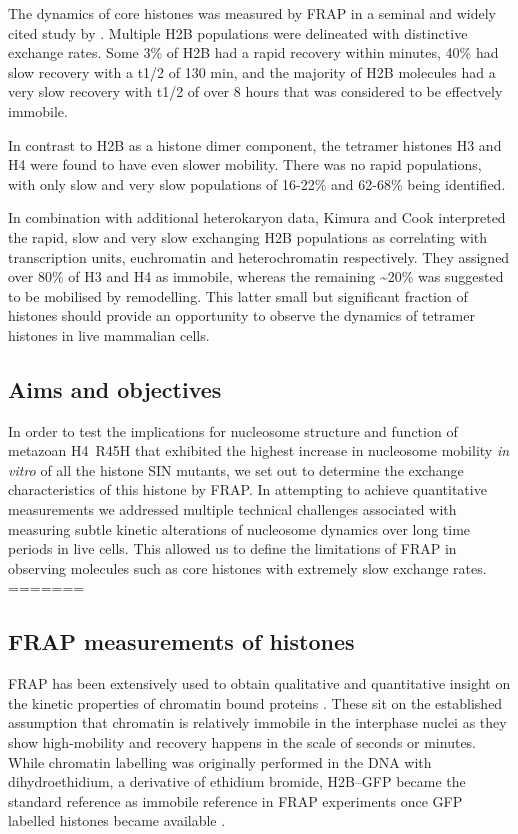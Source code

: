     The dynamics of core histones was measured by FRAP 
    in a seminal and widely cited study by \citet{KimuraCook}.
    Multiple H2B populations were delineated with distinctive exchange rates.
    Some 3\% of H2B had a rapid recovery within minutes, 
    40\% had slow recovery with a t1/2 of 130 min, 
    and the majority of H2B molecules had a very slow recovery with t1/2 of over 8 hours
    that was considered to be effectvely immobile.

    In contrast to H2B as a histone dimer component,
    the tetramer histones H3 and H4 were found to have even slower mobility.
    There was no rapid populations, with only slow and very slow populations 
    of 16-22\% and 62-68\% being identified.
    
    In combination with additional heterokaryon data, Kimura and Cook 
    interpreted the rapid, slow and very slow exchanging H2B populations 
    as correlating with transcription units, euchromatin and heterochromatin respectively.
    They assigned over 80\% of H3 and H4 as immobile, 
    whereas the remaining \textasciitilde20\% was suggested to be mobilised by remodelling.
    This latter small but significant fraction of histones should provide an 
    opportunity to observe the dynamics of tetramer histones in live mammalian cells.

  \subsection{Aims and objectives}

    In order to test the implications for nucleosome structure and function
    of metazoan H4~R45H that exhibited the highest increase 
    in nucleosome mobility \textit{in vitro} of all the histone SIN mutants,
    we set out to determine the exchange characteristics of this histone by FRAP.
    In attempting to achieve quantitative measurements 
    we addressed multiple technical challenges associated with 
    measuring subtle kinetic alterations of nucleosome dynamics over long time periods in live cells. 
    This allowed us to define the limitations of FRAP in observing molecules 
    such as core histones with extremely slow exchange rates.
=======
  \subsection{FRAP measurements of histones}

    FRAP has been extensively used to obtain qualitative and
    quantitative insight on the kinetic properties of chromatin bound
    proteins \citep{phair2000high, essers2005nuclear, agresti2005gr}.
    These sit on the established assumption that chromatin is
    relatively immobile in the interphase nuclei
    \citep{abney1997chromatin} as they show high-mobility and recovery
    happens in the scale of seconds or minutes.  While chromatin
    labelling was originally performed in the DNA with
    dihydroethidium, a derivative of ethidium bromide, H2B--GFP became
    the standard reference as immobile reference in FRAP experiments
    \citep{dey2000bromodomain} once GFP labelled histones became
    available \citep{KevinH2BGFP}.

